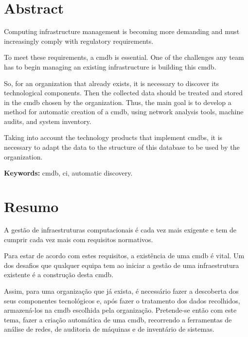 \documentclass[
  oneside,
  11pt, a4paper,
  footinclude=true,
  headinclude=true,
  cleardoublepage=empty
]{scrbook}
\author{Joana Catarina Maciel Pereira}
\date{\myear} %
\begin{document}
	\umfrontcover	
	\umtitlepage
	


	\chapter*{Abstract}
Computing infrastructure management is becoming more demanding and must increasingly comply with regulatory requirements.

To meet these requirements, a \gls{cmdb} is essential. One of the challenges any team has to begin managing an existing infrastructure is building this \gls{cmdb}.

So, for an organization that already exists, it is necessary to discover its technological components. Then the collected data should be treated and stored in the \gls{cmdb} chosen by the organization. Thus, the main goal is to develop a method for automatic creation of a \gls{cmdb}, using network analysis tools, machine audits, and system inventory.

Taking into account the technology products that implement \glspl{cmdb}, it is necessary to adapt the data to the structure of this database to be used by the organization.

\vspace{1cm}
\textbf{Keywords:} \gls{cmdb}, \gls{ci}, automatic discovery.
 	
	\cleardoublepage
	\chapter*{Resumo}
A gestão de infraestruturas computacionais é cada vez mais exigente e tem de cumprir cada vez mais com requisitos normativos. 

Para estar de acordo com estes requisitos, a existência de uma \gls{cmdb} é vital. Um dos desafios que qualquer equipa tem ao iniciar a gestão de uma infraestrutura existente é a construção desta \gls{cmdb}. 

Assim, para uma organização que já exista, é necessário fazer a descoberta dos seus componentes tecnológicos e, após fazer o tratamento dos dados recolhidos, armazená-los na \gls{cmdb} escolhida pela organização. Pretende-se então com este tema, fazer a criação automática de uma \gls{cmdb}, recorrendo a ferramentas de análise de redes, de auditoria de máquinas e de inventário de sistemas. 
\end{document}
